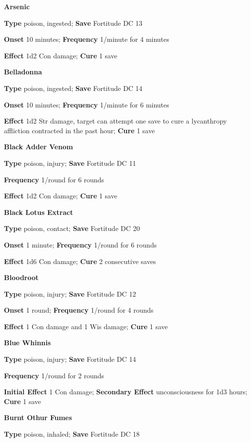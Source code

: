 \textbf{Arsenic}
				
\textbf{Type }poison, ingested; \textbf{Save} Fortitude DC 13 
				
\textbf{Onset }10 minutes; \textbf{Frequency} 1/minute for 4 minutes
				
\textbf{Effect }1d2 Con damage; \textbf{Cure} 1 save
				
\textbf{Belladonna}
				
\textbf{Type} poison, ingested; \textbf{Save} Fortitude DC 14 
				
\textbf{Onset }10 minutes; \textbf{Frequency} 1/minute for 6 minutes
				
\textbf{Effect }1d2 Str damage, target can attempt one save to cure a lycanthropy affliction contracted in the past hour;\textbf{ Cure} 1 save
				
\textbf{Black Adder Venom }
				
\textbf{Type} poison, injury; \textbf{Save} Fortitude DC 11 
				
\textbf{Frequency} 1/round for 6 rounds
				
\textbf{Effect }1d2 Con damage;\textbf{ Cure} 1 save
				
\textbf{Black Lotus Extract }
				
\textbf{Type} poison, contact; \textbf{Save} Fortitude DC 20 
				
\textbf{Onset }1 minute; \textbf{Frequency} 1/round for 6 rounds
				
\textbf{Effect }1d6 Con damage;\textbf{ Cure} 2 consecutive saves
				
\textbf{Bloodroot }
				
\textbf{Type} poison, injury; \textbf{Save} Fortitude DC 12 
				
\textbf{Onset }1 round; \textbf{Frequency} 1/round for 4 rounds
				
\textbf{Effect }1 Con damage and 1 Wis damage;\textbf{ Cure} 1 save
				
\textbf{Blue Whinnis }
				
\textbf{Type} poison, injury; \textbf{Save} Fortitude DC 14
				
\textbf{Frequency} 1/round for 2 rounds
				
\textbf{Initial Effect }1 Con damage; \textbf{Secondary Effect} unconsciousness for 1d3 hours;\textbf{ Cure} 1 save
				
\textbf{Burnt Othur Fumes }
				
\textbf{Type} poison, inhaled; \textbf{Save} Fortitude DC 18 
				
